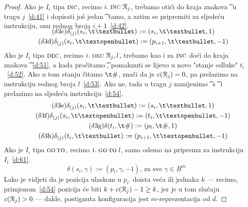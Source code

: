 \begin{proof}
Ako je $I_i$ tipa $\textsc{inc}$, recimo $i.\;\textsc{inc}\;\mathcal R_{j}$, trebamo otići do kraja znakova \t\textbullet\ u tragu $j$~\eqref{d:41} i dopisati još jedan \t\textbullet\ tamo, a zatim se pripremiti za sljedeću instrukciju, onu rednog broja $i+1$~\eqref{d:42}.
\begin{gather*}
\SwapAboveDisplaySkip
\label{d:41}\tag{$\delta$3c}
    \delta_{(j)}(s_i,\t\textbullet):=(s_i,\t\textbullet,1)\\
\label{d:42}\tag{$\delta$3d}
    \delta_{(j)}(s_i,\t\textopenbullet):=(p_{i+1},\t\textbullet,-1)
\end{gather*}
Ako je $I_i$ tipa $\textsc{dec}$, recimo $i.\;\textsc{dec}\;\mathcal R_{j},l$, trebamo kao i za $\textsc{inc}$ doći do kraja znakova~\t\textbullet~\eqref{d:51}, a kada pročitamo \t\textopenbullet, pomaknuti se lijevo u novo "stanje odluke" $t_i$~\eqref{d:52}. Ako u tom stanju čitamo $\t\#$, znači da je $c(\mathcal R_{j})=0$, pa prelazimo na instrukciju rednog broja $l$~\eqref{d:53}. Ako ne, tada u tragu $j$ zamijenimo \t\textbullet\ s \t\textopenbullet\ i prelazimo na sljedeću instrukciju~\eqref{d:54}.
\begin{gather*}
\label{d:51}\tag{$\delta$3e}
    \delta_{(j)}(s_i,\t\textbullet):=(s_i,\t\textbullet,1)\\
\label{d:52}\tag{$\delta$3f}
    \delta_{(j)}(s_i,\t\textopenbullet):=(t_i,\t\textopenbullet,-1)\\
\label{d:53}\tag{$\delta$3g}
    \delta(t_i,\t\#):=(p_l,\t\#,1)\\
\label{d:54}\tag{$\delta$3h}
    \delta_{(j)}(t_i,\t\textbullet):=(p_{i+1},\t\textopenbullet,-1)
\end{gather*}
	Ako je $I_i$ tipa $\textsc{go\,to}$, recimo $i.\;\textsc{go\,to}\;l$, samo odemo na pripremu za instrukciju $I_l$~\eqref{d:61}.
\begin{equation*}
\label{d:61}\tag{$\delta$3i}
    \delta(s_i,\gamma):=(p_l,\gamma,-1)\text{, za sve $\gamma\in B^m$}
\end{equation*}
	Lako je vidjeti da je pozicija ulaskom u $p_{i'}$ doista veća ili jednaka $k$ --- recimo, primjenom~\eqref{d:54} pozicija će biti $k+c(\mathcal R_{j})-1\ge k$, jer je u tom slučaju $c(\mathcal R_{j})>0$ --- dakle, postignuta konfiguracija jest $m$-reprezentacija od $d$.
\end{proof}


